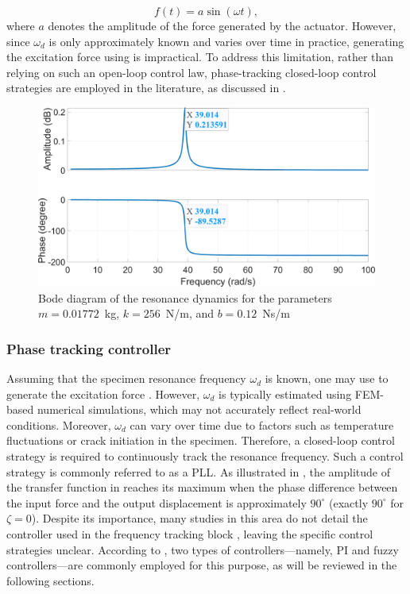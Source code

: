 \documentclass[lettersize,journal]{IEEEtran}
\begin{document}
\begin{equation}
f(t)=a\sin(\omega t),
\label{E_F_resonance}
\end{equation}
where $a$ denotes the amplitude of the force generated by the actuator. However, since $\omega_d$ is only approximately known and varies over time in practice, generating the excitation force using  is impractical. To address this limitation, rather than relying on such an open-loop control law, phase-tracking closed-loop control strategies are employed in the literature, as discussed in .

\begin{figure}
    \centering    \includegraphics[width=\linewidth]{F_bode.png}
    \caption{Bode diagram of the resonance dynamics for the parameters $m=0.01772$~kg, $k=256$~N/m, and $b=0.12$~Ns/m}
    \label{F_Bode}
\end{figure}




\subsubsection{Phase tracking controller} \label{S_frequency_controller}


Assuming that the specimen resonance frequency $\omega_d$ is known, one may use  to generate the excitation force \cite{SCHNEIDER2018171,herrmann2018simulation_Thesis,SCHRAMM2024117045}. However, $\omega_d$ is typically estimated using FEM-based numerical simulations, which may not accurately reflect real-world conditions. Moreover, $\omega_d$ can vary over time due to factors such as temperature fluctuations or crack initiation in the specimen. Therefore, a closed-loop control strategy is required to continuously track the resonance frequency. Such a control strategy is commonly referred to as a PLL. As illustrated in , the amplitude of the transfer function in  reaches its maximum when the phase difference between the input force and the output displacement is approximately $90^\circ$ (exactly $90^\circ$ for $\zeta = 0$). Despite its importance, many studies in this area do not detail the controller used in the frequency tracking block \cite{Gautrelet_2020}, leaving the specific control strategies unclear. According to , two types of controllers—namely, PI and fuzzy controllers—are commonly employed for this purpose, as will be reviewed in the following sections.
\end{document}
